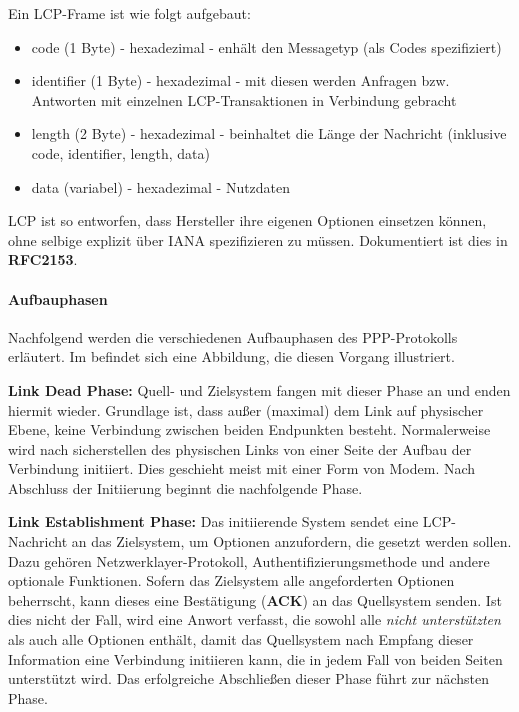Ein LCP-Frame ist wie folgt aufgebaut:
\begin{itemize}
	\item code (1 Byte) - hexadezimal - enhält den Messagetyp (als Codes spezifiziert)
	\item identifier (1 Byte) - hexadezimal - mit diesen werden Anfragen bzw. Antworten mit einzelnen LCP-Transaktionen in Verbindung gebracht
	\item length (2 Byte) - hexadezimal - beinhaltet die Länge der Nachricht (inklusive code, identifier, length, data)
	\item data (variabel) - hexadezimal - Nutzdaten
\end{itemize}

\ac{LCP} ist so entworfen, dass Hersteller ihre eigenen Optionen einsetzen können, ohne
selbige explizit über \ac{IANA} spezifizieren zu müssen. Dokumentiert ist dies in \textbf{RFC2153}.

\paragraph{Aufbauphasen} Nachfolgend werden die verschiedenen Aufbauphasen des
PPP-Protokolls erläutert. Im  befindet
sich eine Abbildung, die diesen Vorgang illustriert.

\textbf{Link Dead Phase:}
Quell- und Zielsystem fangen mit dieser Phase an und enden hiermit wieder.
Grundlage ist, dass außer (maximal) dem Link auf physischer Ebene,
keine Verbindung zwischen beiden Endpunkten besteht. Normalerweise
wird nach sicherstellen des physischen Links von einer Seite der
Aufbau der Verbindung initiiert. Dies geschieht meist mit einer Form von Modem.
Nach Abschluss der Initiierung beginnt die nachfolgende Phase.

\textbf{Link Establishment Phase:}
Das initiierende System sendet eine \ac{LCP}-Nachricht an das Zielsystem,
um Optionen anzufordern, die gesetzt werden sollen. Dazu gehören
Netzwerklayer-Protokoll, Authentifizierungsmethode und andere optionale
Funktionen. Sofern das Zielsystem alle angeforderten Optionen beherrscht,
kann dieses eine Bestätigung (\textbf{ACK}) an das Quellsystem senden.
Ist dies nicht der Fall, wird eine Anwort verfasst, die sowohl alle
\textit{nicht unterstützten} als auch alle  Optionen
enthält, damit das Quellsystem nach Empfang dieser Information eine
Verbindung initiieren kann, die in jedem Fall von beiden Seiten unterstützt
wird. Das erfolgreiche Abschließen dieser Phase führt zur nächsten Phase.

